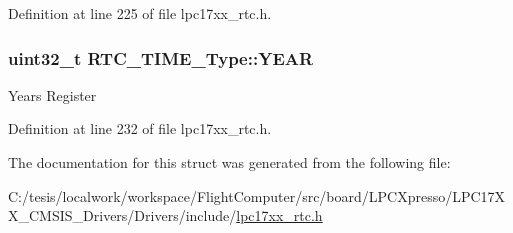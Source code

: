 \-Definition at line 225 of file lpc17xx\-\_\-rtc.\-h.

\hypertarget{struct_r_t_c___t_i_m_e___type_a81f7d3b93c2ef20925cf614f0efe4efe}{
\subsubsection[{\-Y\-E\-A\-R}]{\setlength{\rightskip}{0pt plus 5cm}uint32\-\_\-t {\bf \-R\-T\-C\-\_\-\-T\-I\-M\-E\-\_\-\-Type\-::\-Y\-E\-A\-R}}}\label{struct_r_t_c___t_i_m_e___type_a81f7d3b93c2ef20925cf614f0efe4efe}
\-Years \-Register 

\-Definition at line 232 of file lpc17xx\-\_\-rtc.\-h.



\-The documentation for this struct was generated from the following file\-:\begin{DoxyCompactItemize}
\item 
\-C\-:/tesis/localwork/workspace/\-Flight\-Computer/src/board/\-L\-P\-C\-Xpresso/\-L\-P\-C17\-X\-X\-\_\-\-C\-M\-S\-I\-S\-\_\-\-Drivers/\-Drivers/include/\hyperlink{lpc17xx__rtc_8h}{lpc17xx\-\_\-rtc.\-h}\end{DoxyCompactItemize}
